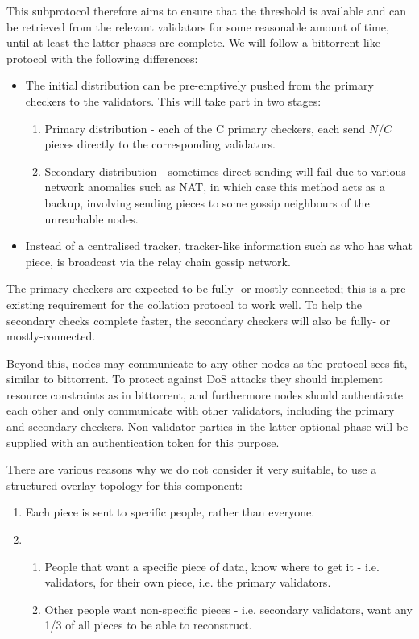 This subprotocol therefore aims to ensure that the threshold is available and can be retrieved from the relevant validators for some reasonable amount of time, until at least the latter phases are complete. We will follow a bittorrent-like protocol with the following differences:

\begin{itemize}
\item The initial distribution can be pre-emptively pushed from the primary checkers to the validators. This will take part in two stages:
\begin{enumerate}
\item Primary distribution - each of the C primary checkers, each send $N/C$ pieces directly to the corresponding validators.
\item Secondary distribution - sometimes direct sending will fail due to various network anomalies such as NAT, in which case this method acts as a backup, involving sending pieces to some gossip neighbours of the unreachable nodes.
\end{enumerate}
\item Instead of a centralised tracker, tracker-like information such as who has what piece, is broadcast via the relay chain gossip network.
\end{itemize}

The primary checkers are expected to be fully- or mostly-connected; this is a pre-existing requirement for the collation protocol to work well. To help the secondary checks complete faster, the secondary checkers will also be fully- or mostly-connected.

Beyond this, nodes may communicate to any other nodes as the protocol sees fit, similar to bittorrent. To protect against DoS attacks they should implement resource constraints as in bittorrent, and furthermore nodes should authenticate each other and only communicate with other validators, including the primary and secondary checkers. Non-validator parties in the latter optional phase will be supplied with an authentication token for this purpose.

There are various reasons why we do not consider it very suitable, to use a
structured overlay topology for this component:

\begin{enumerate}
\item Each piece is sent to specific people, rather than everyone.
\item
\begin{enumerate}
\item People that want a specific piece of data, know where to get it - i.e.
      validators, for their own piece, i.e. the primary validators.
\item Other people want non-specific pieces - i.e. secondary validators,
      want any 1/3 of all pieces to be able to reconstruct.
\end{enumerate}
\end{enumerate}

